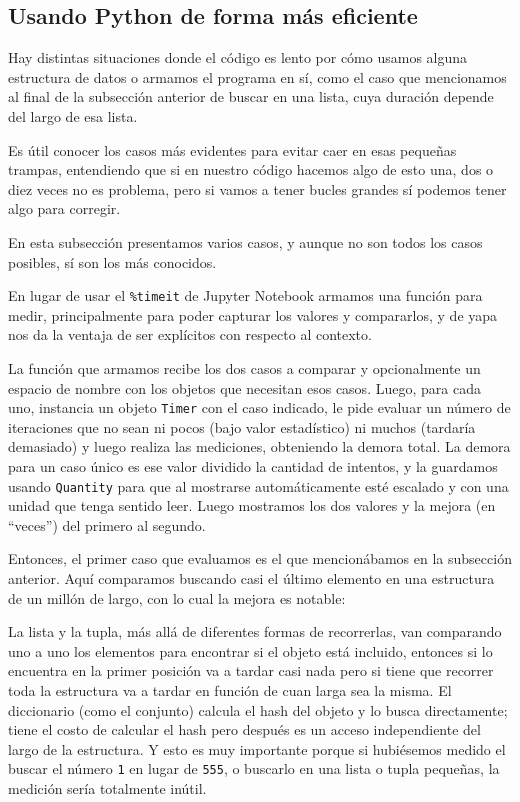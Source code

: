 \subsection{Usando Python de forma más eficiente}

Hay distintas situaciones donde el código es lento por cómo usamos alguna estructura de datos o armamos el programa en sí, como el caso que mencionamos al final de la subsección anterior de buscar en una lista, cuya duración depende del largo de esa lista. 

Es útil conocer los casos más evidentes para evitar caer en esas pequeñas trampas, entendiendo que si en nuestro código hacemos algo de esto una, dos o diez veces no es problema, pero si vamos a tener bucles grandes sí podemos tener algo para corregir. 

En esta subsección presentamos varios casos, y aunque no son todos los casos posibles, sí son los más conocidos.

En lugar de usar el \texttt{\%timeit} de Jupyter Notebook armamos una función para medir, principalmente para poder capturar los valores y compararlos, y de yapa nos da la ventaja de ser explícitos con respecto al contexto.


La función que armamos recibe los dos casos a comparar y opcionalmente un espacio de nombre con los objetos que necesitan esos casos. Luego, para cada uno, instancia un objeto \texttt{Timer} con el caso indicado, le pide evaluar un número de iteraciones que no sean ni pocos (bajo valor estadístico) ni muchos (tardaría demasiado) y luego realiza las mediciones, obteniendo la demora total. La demora para un caso único es ese valor dividido la cantidad de intentos, y la guardamos usando \texttt{Quantity} para que al mostrarse automáticamente esté escalado y con una unidad que tenga sentido leer. Luego mostramos los dos valores y la mejora (en ``veces'') del primero al segundo. 

Entonces, el primer caso que evaluamos es el que mencionábamos en la subsección anterior. Aquí comparamos buscando casi el último elemento en una estructura de un millón de largo, con lo cual la mejora es notable:


La lista y la tupla, más allá de diferentes formas de recorrerlas, van comparando uno a uno los elementos para encontrar si el objeto está incluido, entonces si lo encuentra en la primer posición va a tardar casi nada pero si tiene que recorrer toda la estructura va a tardar en función de cuan larga sea la misma. El diccionario (como el conjunto) calcula el hash del objeto y lo busca directamente; tiene el costo de calcular el hash pero después es un acceso independiente del largo de la estructura. Y esto es muy importante porque si hubiésemos medido el buscar el número \texttt{1} en lugar de \texttt{555}, o buscarlo en una lista o tupla pequeñas, la medición sería totalmente inútil.


